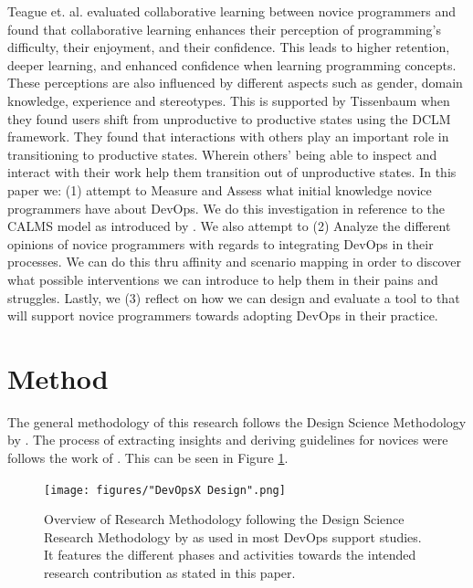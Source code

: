 \documentclass{sigchi}
\begin{document}
Teague et. al. \cite{teague2008collaborative} evaluated collaborative learning between novice programmers and found that collaborative learning enhances their perception of programming’s difficulty, their enjoyment, and their confidence. This leads to higher retention, deeper learning, and enhanced confidence when learning programming concepts. These perceptions are also influenced by different aspects such as gender, domain knowledge, experience and stereotypes. This is supported by Tissenbaum \cite{tissenbaum2020see} when they found users shift from unproductive to productive states using the DCLM framework. They found that interactions with others play an important role in transitioning to productive states. Wherein others’ being able to inspect and interact with their work help them transition out of unproductive states. In this paper we: (1) attempt to Measure and Assess what initial knowledge novice programmers have about DevOps. We do this investigation in reference to the CALMS model as introduced by \cite{riley2014keep}. We also attempt to (2) Analyze the different opinions of novice programmers with regards to integrating DevOps in their processes. We can do this thru affinity and scenario mapping in order to discover what possible interventions we can introduce to help them in their pains and struggles. Lastly, we (3) reflect on how we can design and evaluate a tool to that will support novice programmers towards adopting DevOps in their practice.

\section{Method}
The general methodology of this research follows the Design Science Methodology by \cite{peffers2007design}. The process of extracting insights and deriving guidelines for novices were follows the work of \cite{nodalo2019building}. This can be seen in Figure \ref{fig:framework}. 
\begin{figure}
    \centering
    \texttt{[image: figures/"DevOpsX Design".png]}
    \caption{Overview of Research Methodology following the Design Science Research Methodology by \cite{peffers2007design} as used in most DevOps support studies. It features the different phases and activities towards the intended research contribution as stated in this paper.}
    \label{fig:framework}
\end{figure}
\end{document}
